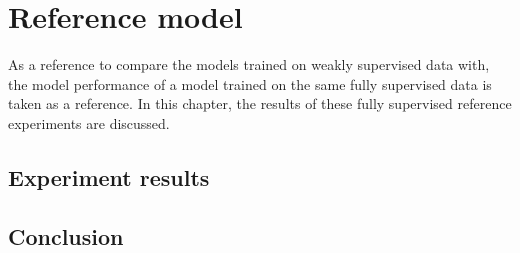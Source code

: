 \chapter{Reference model\label{sec:reference_model}}

\par{
    As a reference to compare the models trained on weakly supervised data with, the model performance of a model trained on the same fully supervised data is taken as a reference.
    In this chapter, the results of these fully supervised reference experiments are discussed.
}

\section{Experiment results}


\section{Conclusion}